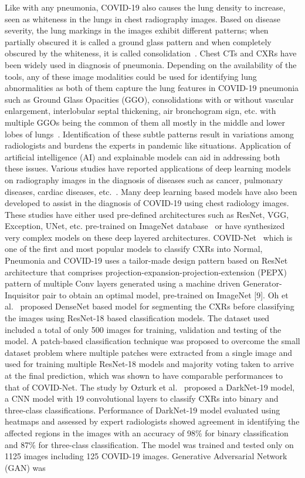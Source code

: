 \documentclass[10pt,journal,compsoc]{IEEEtran}
\begin{document}
Like with any pneumonia, COVID-19 also causes the lung density to increase, seen as whiteness in the lungs in chest radiography images. Based on disease severity, the lung markings in the images exhibit different patterns; when partially obscured it is called a ground glass pattern and when completely obscured by the whiteness, it is called consolidation~\cite{cleverley2020role}. Chest CTs and CXRs have been widely used in diagnosis of pneumonia. Depending on the availability of the tools, any of these image modalities could be used for identifying lung abnormalities as both of them capture the lung features in COVID-19 pneumonia such as Ground Glass Opacities (GGO), consolidations with or without vascular enlargement, interlobular septal thickening, air bronchogram sign, etc. with multiple GGOs being the common of them all mostly in the middle and lower lobes of lungs~\cite{li2020coronavirus}. Identification of these subtle patterns result in variations among radiologists and burdens the experts in pandemic like situations. Application of artificial intelligence (AI) and explainable models can aid in addressing both these issues. Various studies have reported applications of deep learning models on radiography images in the diagnosis of diseases such as cancer, pulmonary diseases, cardiac diseases, etc.~\cite{litjens2017survey}. Many deep learning based models have also been developed to assist in the diagnosis of COVID-19 using chest radiology images. These studies have either used pre-defined architectures such as ResNet, VGG, Exception, UNet, etc. pre-trained on ImageNet database~\cite{deng2009imagenet} or have synthesized very complex models on these deep layered architectures. COVID-Net~\cite{wang2020covid} which is one of the first and most popular models to classify CXRs into Normal, Pneumonia and COVID-19 uses a tailor-made design pattern based on ResNet architecture that comprises projection-expansion-projection-extension (PEPX) pattern of multiple Conv layers generated using a machine driven Generator-Inquisitor pair to obtain an optimal model, pre-trained on ImageNet [9]. Oh et al.~\cite{oh2020deep} proposed DenseNet based model for segmenting the CXRs before classifying the images using ResNet-18 based classification models. The dataset used included a total of only 500 images for training, validation and testing of the model. A patch-based classification technique was proposed to overcome the small dataset problem where multiple patches were extracted from a single image and used for training multiple ResNet-18 models and majority voting taken to arrive at the final prediction, which was shown to have comparable performances to that of COVID-Net. The study by Ozturk et al.~\cite{ozturk2020automated} proposed a DarkNet-19 model, a CNN model with 19 convolutional layers to classify CXRs into binary and three-class classifications. Performance of DarkNet-19 model evaluated using heatmaps and assessed by expert radiologists showed agreement in identifying the affected regions in the images with an accuracy of 98\% for binary classification and 87\% for three-class classification. The model was trained and tested only on 1125 images including 125 COVID-19 images. Generative Adversarial Network (GAN) was 
\end{document}
